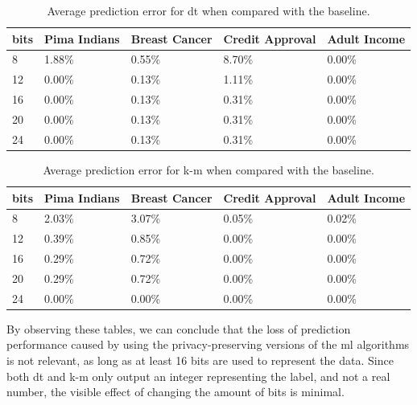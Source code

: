 \begin{table}[H]
\centering
\caption{Average prediction error for \ac{dt} when compared with the baseline.}
\label{table:avgErrorDT}
\begin{tabular}{|l|l|l|l|l|}
\hline
bits & Pima Indians & Breast Cancer & Credit Approval & Adult Income \\ \hline
8    & 1.88\%       & 0.55\%        & 8.70\%          & 0.00\%       \\ \hline
12   & 0.00\%       & 0.13\%        & 1.11\%          & 0.00\%       \\ \hline
16   & 0.00\%       & 0.13\%        & 0.31\%          & 0.00\%       \\ \hline
20   & 0.00\%       & 0.13\%        & 0.31\%          & 0.00\%       \\ \hline
24   & 0.00\%       & 0.13\%        & 0.31\%          & 0.00\%       \\ \hline
\end{tabular}
\end{table}

\begin{table}[H]
\centering
\caption{Average prediction error for \ac{k-m} when compared with the baseline.}
\label{table:avgErrorKM}
\begin{tabular}{|l|l|l|l|l|}
\hline
bits & Pima Indians & Breast Cancer & Credit Approval & Adult Income \\ \hline
8    & 2.03\%       & 3.07\%        &    0.05\%       &     0.02\%   \\ \hline
12   & 0.39\%       & 0.85\%        &    0.00\%       &     0.00\%   \\ \hline
16   & 0.29\%       & 0.72\%        &    0.00\%       &     0.00\%   \\ \hline
20   & 0.29\%       & 0.72\%        &    0.00\%       &     0.00\%   \\ \hline
24   & 0.00\%       & 0.00\%        &    0.00\%       &     0.00\%   \\ \hline
\end{tabular}
\end{table}

By observing these tables, we can conclude that the loss of prediction performance caused by using the privacy-preserving versions of the \ac{ml} algorithms is not relevant, as long as at least 16 bits are used to represent the data. Since both \ac{dt} and \ac{k-m} only output an integer representing the label, and not a real number, the visible effect of changing the amount of bits is minimal.

